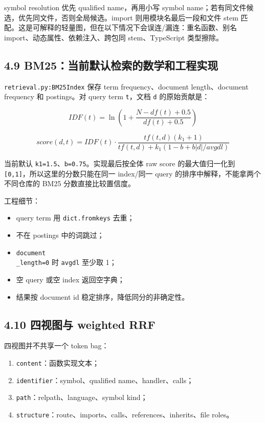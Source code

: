 \documentclass[UTF8,12pt,openany]{ctexbook}
\begin{document}
symbol resolution 优先 qualified name，再用小写 symbol name；若有同文件候选，优先同文件，否则全局候选。import 则用模块名最后一段和文件 stem 匹配。这是可解释的轻量图，但在以下情况下会误连/漏连：重名函数、别名 import、动态属性、依赖注入、跨包同 stem、TypeScript 类型擦除。\par

\subsection{4.9 BM25：当前默认检索的数学和工程实现}

\texttt{retrieval.py:BM25Index} 保存 term frequency、document length、document frequency 和 postings。对 query term \texttt{t}，文档 \texttt{d} 的原始贡献是：\par

\[
IDF(t)=\ln\left(1+\frac{N-df(t)+0.5}{df(t)+0.5}\right)
\]

\[
score(d,t)=IDF(t)\cdot
\frac{tf(t,d)(k_1+1)}{tf(t,d)+k_1(1-b+b|d|/avgdl)}
\]

当前默认 \texttt{k1=1.5}、\texttt{b=0.75}。实现最后按全体 raw score 的最大值归一化到 \texttt{[0,1]}，所以这里的分数只能在同一 index/同一 query 的排序中解释，不能拿两个不同仓库的 BM25 分数直接比较置信度。\par

工程细节：\par

\begin{itemize}
\item query term 用 \texttt{dict.fromkeys} 去重；
\item 不在 postings 中的词跳过；
\item \texttt{document\\_length=0} 时 \texttt{avgdl} 至少取 1；
\item 空 query 或空 index 返回空字典；
\item 结果按 document id 稳定排序，降低同分的非确定性。
\end{itemize}

\subsection{4.10 四视图与 weighted RRF}

四视图并不共享一个 token bag：\par

\begin{enumerate}
\item \texttt{content}：函数实现文本；
\item \texttt{identifier}：symbol、qualified name、handler、calls；
\item \texttt{path}：relpath、language、symbol kind；
\item \texttt{structure}：route、imports、calls、references、inherits、file roles。
\end{enumerate}
\end{document}
